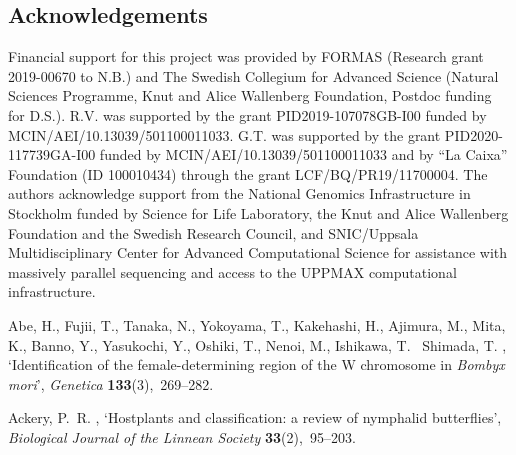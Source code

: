 \documentclass[twocolumn]{bmcart}%
\begin{document}
\begin{backmatter}
\section*{Acknowledgements}%
Financial support for this project was provided by FORMAS (Research grant 2019-00670 to N.B.) and The Swedish Collegium for Advanced Science (Natural Sciences Programme, Knut and Alice Wallenberg Foundation, Postdoc funding for D.S.). R.V. was supported by the grant PID2019-107078GB-I00 funded by MCIN/AEI/10.13039/501100011033. G.T. was supported by the grant PID2020-117739GA-I00 funded by MCIN/AEI/10.13039/501100011033 and by “La Caixa” Foundation (ID 100010434) through the grant LCF/BQ/PR19/11700004. The authors acknowledge support from the National Genomics Infrastructure in Stockholm funded by Science for Life Laboratory, the Knut and Alice Wallenberg Foundation and the Swedish Research Council, and SNIC/Uppsala Multidisciplinary Center for Advanced Computational Science for assistance with massively parallel sequencing and access to the UPPMAX computational infrastructure.

%
\begin{thebibliography}{xx}

Abe, H., Fujii, T., Tanaka, N., Yokoyama, T., Kakehashi, H., Ajimura, M., Mita,
  K., Banno, Y., Yasukochi, Y., Oshiki, T., Nenoi, M., Ishikawa, T.
  \harvardand\ Shimada, T.  \harvardyearleft 2008\harvardyearright ,
  `Identification of the female-determining region of the {{W}} chromosome in
  \textit{Bombyx mori}', {\em Genetica} {\bf 133}(3),~269--282.

Ackery, P.~R.  \harvardyearright , `Hostplants and
  classification: a review of nymphalid butterflies', {\em Biological Journal
  of the Linnean Society} {\bf 33}(2),~95--203.


\end{thebibliography}
\end{backmatter}
\end{document}
